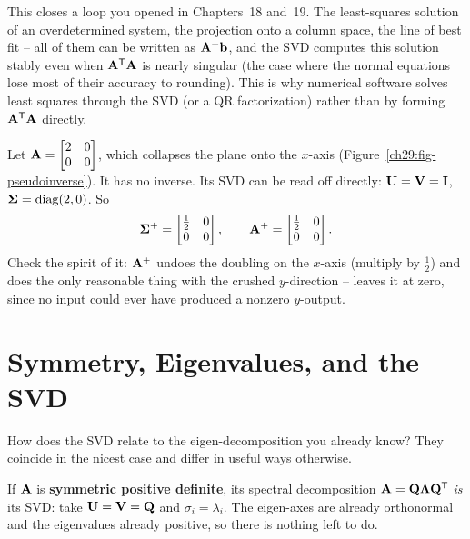 This closes a loop you opened in Chapters~18 and~19. The least-squares solution of an
overdetermined system, the projection onto a column space, the line of best fit --
all of them can be written as $\mathbf{A}^+\mathbf{b}$, and the SVD computes this solution stably even
when $\mathbf{A}^{\mathsf{T}}\mathbf{A}$ is nearly singular (the case where the normal equations
lose most of their accuracy to rounding). This is why numerical software solves least squares
through the SVD (or a QR factorization) rather than by forming $\mathbf{A}^{\mathsf{T}}\mathbf{A}$ directly.

\begin{example}
\label{ch29:ex-pseudoinverse}
Let $\mathbf{A} = \begin{bmatrix} 2 & 0 \\ 0 & 0\end{bmatrix}$, which collapses the
plane onto the $x$-axis (Figure~\ref{ch29:fig-pseudoinverse}). It has no inverse.
Its SVD can be read off directly:
$\mathbf{U} = \mathbf{V} = \mathbf{I}$, $\mathbf{\Sigma} = \operatorname{diag}(2,0)$. So
\[
  \mathbf{\Sigma}^+ = \begin{bmatrix} \tfrac12 & 0 \\ 0 & 0 \end{bmatrix},
  \qquad
  \mathbf{A}^+ = \begin{bmatrix} \tfrac12 & 0 \\ 0 & 0 \end{bmatrix}.
\]
Check the spirit of it: $\mathbf{A}^+$ undoes the doubling on the $x$-axis (multiply
by $\tfrac12$) and does the only reasonable thing with the crushed $y$-direction
-- leaves it at zero, since no input could ever have produced a nonzero
$y$-output.
\end{example}

\section{Symmetry, Eigenvalues, and the SVD}
\label{ch29:symmetric-link}

How does the SVD relate to the eigen-decomposition you already know? They coincide
in the nicest case and differ in useful ways otherwise.

If $\mathbf{A}$ is \textbf{symmetric positive definite}, its spectral decomposition
$\mathbf{A} = \mathbf{Q}\mathbf{\Lambda}\mathbf{Q}^{\mathsf{T}}$ \emph{is} its SVD: take $\mathbf{U} =
\mathbf{V} = \mathbf{Q}$ and $\sigma_i = \lambda_i$. The eigen-axes are already
orthonormal and the eigenvalues already positive, so there is nothing left to do.

